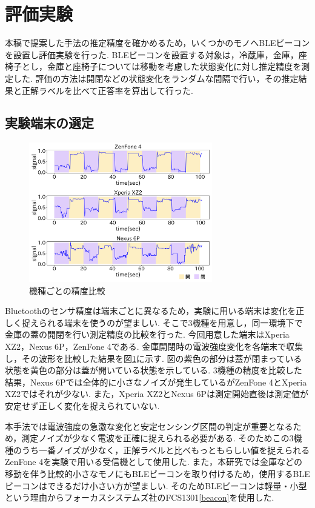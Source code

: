 \documentclass[Japanese]{dicomopapers}
\begin{document}


\section{評価実験}

本稿で提案した手法の推定精度を確かめるため，いくつかのモノへBLEビーコンを設置し評価実験を行った.
BLEビーコンを設置する対象は，冷蔵庫，金庫，座椅子とし，金庫と座椅子については移動を考慮した状態変化に対し推定精度を測定した.
評価の方法は開閉などの状態変化をランダムな間隔で行い，その推定結果と正解ラベルを比べて正答率を算出して行った.

\subsection{実験端末の選定}

\begin{figure}[tbh]
    \centering
    \includegraphics[width=8cm]{mix.png}
    \caption{機種ごとの精度比較}
    \label{multi-data}
\end{figure}

Bluetoothのセンサ精度は端末ごとに異なるため，実験に用いる端末は変化を正しく捉えられる端末を使うのが望ましい.
そこで3機種を用意し，同一環境下で金庫の蓋の開閉を行い測定精度の比較を行った.
今回用意した端末はXperia XZ2，Nexus 6P，ZenFone 4である.
金庫開閉時の電波強度変化を各端末で収集し，その波形を比較した結果を図\ref{multi-data}に示す.
図の紫色の部分は蓋が閉まっている状態を黄色の部分は蓋が開いている状態を示している.
3機種の精度を比較した結果，Nexus 6Pでは全体的に小さなノイズが発生しているがZenFone 4とXperia XZ2ではそれが少ない.
また，Xperia XZ2とNexus 6Pは測定開始直後は測定値が安定せず正しく変化を捉えられていない.

本手法では電波強度の急激な変化と安定センシング区間の判定が重要となるため，測定ノイズが少なく電波を正確に捉えられる必要がある.
そのためこの3機種のうち一番ノイズが少なく，正解ラベルと比べもっともらしい値を捉えられるZenFone 4を実験で用いる受信機として使用した.
また，本研究では金庫などの移動を伴う比較的小さなモノにもBLEビーコンを取り付けるため，使用するBLEビーコンはできるだけ小さい方が望ましい.
そのためBLEビーコンは軽量・小型という理由からフォーカスシステムズ社のFCS1301\ref{beacon}を使用した.
\end{document}
